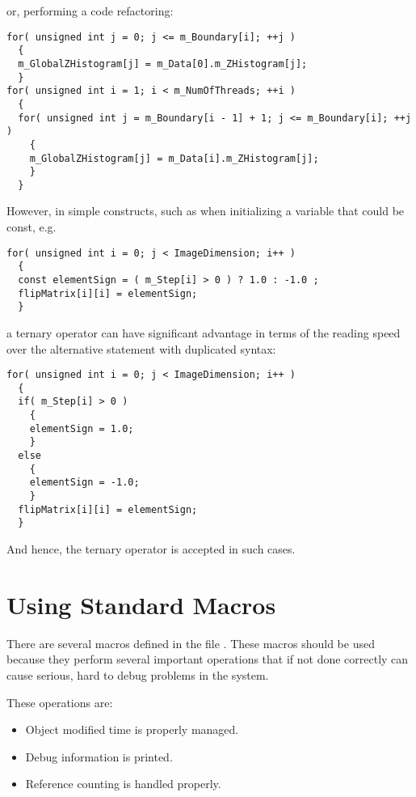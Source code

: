 or, performing a code refactoring:

\small
\begin{verbatim}
for( unsigned int j = 0; j <= m_Boundary[i]; ++j )
  {
  m_GlobalZHistogram[j] = m_Data[0].m_ZHistogram[j];
  }
for( unsigned int i = 1; i < m_NumOfThreads; ++i )
  {
  for( unsigned int j = m_Boundary[i - 1] + 1; j <= m_Boundary[i]; ++j )
    {
    m_GlobalZHistogram[j] = m_Data[i].m_ZHistogram[j];
    }
  }
\end{verbatim}
\normalsize

However, in simple constructs, such as when initializing a variable that could
be const, e.g.

\small
\begin{verbatim}
for( unsigned int i = 0; j < ImageDimension; i++ )
  {
  const elementSign = ( m_Step[i] > 0 ) ? 1.0 : -1.0 ;
  flipMatrix[i][i] = elementSign;
  }
\end{verbatim}
\normalsize

a ternary operator can have significant advantage in terms of the reading speed
over the alternative  statement with duplicated syntax:

\small
\begin{verbatim}
for( unsigned int i = 0; j < ImageDimension; i++ )
  {
  if( m_Step[i] > 0 )
    {
    elementSign = 1.0;
    }
  else
    {
    elementSign = -1.0;
    }
  flipMatrix[i][i] = elementSign;
  }
\end{verbatim}
\normalsize

And hence, the ternary operator is accepted in such cases.


\section{Using Standard Macros}
\label{sec:UsingStandardMacros}

There are several macros defined in the file . These macros
should be used because they perform several important operations that if not
done correctly can cause serious, hard to debug problems in the system.

These operations are:
\begin{itemize}
\item Object modified time is properly managed.
\item Debug information is printed.
\item Reference counting is handled properly.
\end{itemize}

